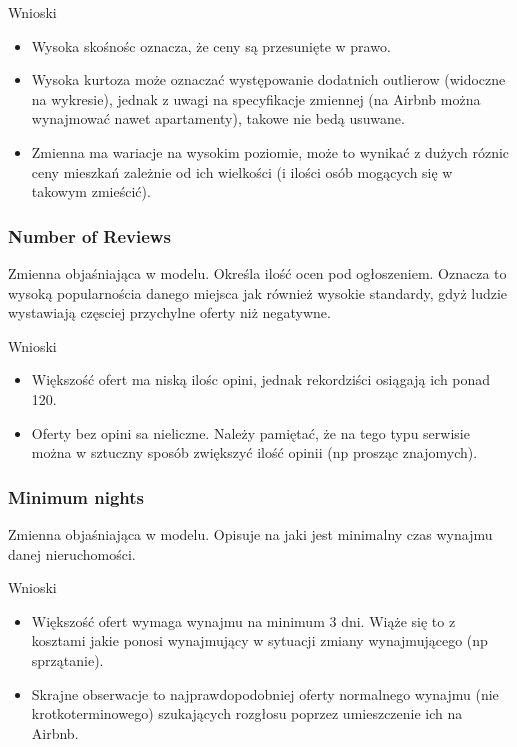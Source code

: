 
Wnioski

\begin{itemize}
    \item Wysoka skośnośc oznacza, że ceny są przesunięte w prawo.
    \item Wysoka kurtoza może oznaczać występowanie dodatnich outlierow (widoczne na wykresie), jednak z uwagi na specyfikacje zmiennej (na Airbnb można wynajmować nawet apartamenty), takowe nie bedą usuwane.
    \item Zmienna ma wariacje na wysokim poziomie, może to wynikać z dużych róznic ceny mieszkań zależnie od ich wielkości (i ilości osób mogących się w takowym zmieścić).
\end{itemize}

\subsubsection{Number of Reviews}\label{subsubsec:number-of-reviews}
Zmienna objaśniająca w modelu.
Określa ilość ocen pod ogłoszeniem. Oznacza to wysoką popularnościa danego miejsca jak również wysokie standardy, gdyż ludzie wystawiają częsciej przychylne oferty niż negatywne.



Wnioski

\begin{itemize}
    \item Większość ofert ma niską ilośc opini, jednak rekordziści osiągają ich ponad 120.
    \item Oferty bez opini sa nieliczne.
    Należy pamiętać, że na tego typu serwisie można w sztuczny sposób zwiększyć ilość opinii (np prosząc znajomych).
\end{itemize}

\subsubsection{Minimum nights}\label{subsubsec:minimum-nights}
Zmienna objaśniająca w modelu.
Opisuje na jaki jest minimalny czas wynajmu danej nieruchomości.



Wnioski

\begin{itemize}
    \item Większość ofert wymaga wynajmu na minimum 3 dni.
    Wiąże się to z kosztami jakie ponosi wynajmujący w sytuacji zmiany wynajmującego (np sprzątanie).
    \item Skrajne obserwacje to najprawdopodobniej oferty normalnego wynajmu (nie krotkoterminowego) szukających rozgłosu poprzez umieszczenie ich na Airbnb.
\end{itemize}

